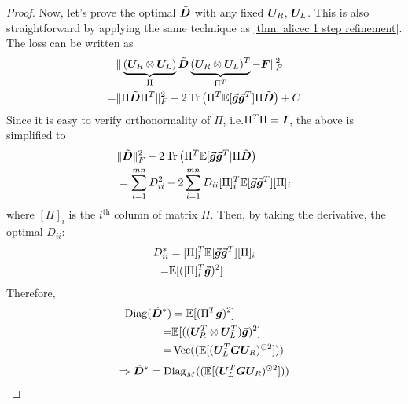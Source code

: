 \begin{proof}
    Now, let's prove the optimal $\tilde{{\bm{D}}}$ with any fixed ${\bm{U}}_R$, ${\bm{U}}_L$. This is also straightforward by applying the same technique as \cref{thm: alicec 1 step refinement}. 
    The loss can be written as 
    \begin{align*}
        &\Vert\underbrace{({\bm{U}}_R\otimes {\bm{U}}_L)}_{\Pi}\tilde{{\bm{D}}}\underbrace{({\bm{U}}_R\otimes {\bm{U}}_L)^T}_{\Pi^T}-{\bm{F}}\Vert_F^2\\
        =& \Vert\Pi\tilde{{\bm{D}}}\Pi^T\Vert_F^2 - 2\operatorname{Tr}\left(\Pi^T\mathbb{E}[\vec{\bm{g}}\vec{\bm{g}}^T]\Pi\tilde{{\bm{D}}}\right) + C
    \end{align*}
    Since it is easy to verify orthonormality of $\Pi$, i.e.$\Pi^T\Pi={\bm{I}}$, the above is simplified to
    \begin{align*}
        &\Vert\tilde{{\bm{D}}}\Vert_F^2-2\operatorname{Tr}\left(\Pi^T\mathbb{E}[\vec{\bm{g}}\vec{\bm{g}}^T]\Pi\tilde{{\bm{D}}}\right)\\
        &=\sum_{i=1}^{mn} D_{ii}^2 -2 \sum_{i=1}^{mn} D_{ii}[\Pi]_{i}^T\mathbb{E}[\vec{\bm{g}}\vec{\bm{g}}^T][\Pi]_{i}
    \end{align*}
    where $[\Pi]_i$ is the $i^{\text{th}}$ column of matrix $\Pi$. Then, by taking the derivative, the optimal $D_{ii}$:
    \begin{align*}
        D^*_{ii} &= [\Pi]_i^T\mathbb{E}[\vec{\bm{g}}\vec{\bm{g}}^T][\Pi]_i\\
        =&\mathbb{E}[([\Pi]_i^T\vec{\bm{g}})^2]
    \end{align*}
    Therefore, 
    \begin{align*}
        \operatorname{Diag}(\tilde{{\bm{D}}}^*) &= \mathbb{E}[(\Pi^T\vec{\bm{g}})^2]\\
        =& \mathbb{E}[(({\bm{U}}_R^T\otimes {\bm{U}}_L^T)\vec{\bm{g}})^2]\\
        =&\operatorname{Vec}((\mathbb{E}[({\bm{U}}_L^T{\bm{G}}{\bm{U}}_R)^{\odot 2}]))\\
    \end{align*}
    \begin{align*}
        \Rightarrow \tilde{{\bm{D}}}^* = \operatorname{Diag}_M((\mathbb{E}[({\bm{U}}_L^T{\bm{G}}{\bm{U}}_R)^{\odot 2}]))
    \end{align*}
    
\end{proof}